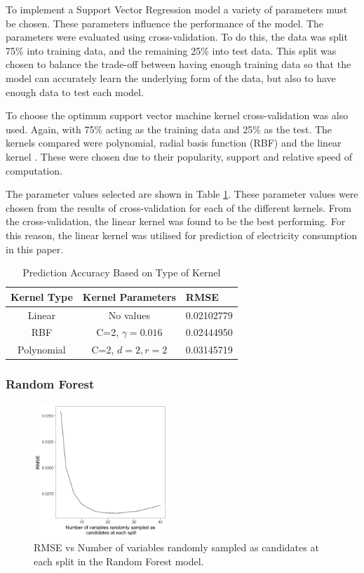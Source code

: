 To implement a Support Vector Regression model a variety of parameters must be chosen. These parameters influence the performance of the model. The parameters were evaluated using cross-validation. To do this, the data was split 75\% into training data, and the remaining 25\% into test data. This split was chosen to balance the trade-off between having enough training data so that the model can accurately learn the underlying form of the data, but also to have enough data to test each model.

To choose the optimum support vector machine kernel cross-validation was also used. Again, with 75\% acting as the training data and 25\% as the test. The kernels compared were polynomial, radial basis function (RBF) and the linear kernel \cite{Chang2010, theodoridis2009pattern}. These were chosen due to their popularity, support and relative speed of computation.

The parameter values selected are shown in Table \ref{tab:kernel}. These parameter values were chosen from the results of cross-validation for each of the different kernels.  From the cross-validation, the linear kernel was found to be the best performing. For this reason, the linear kernel was utilised for prediction of electricity consumption in this paper.

\begin{table}
	\caption{Prediction Accuracy Based on Type of Kernel}
	\label{tab:kernel}
	\begin{tabular}{ccl}
		\toprule
		Kernel Type& Kernel Parameters & RMSE\\
		\midrule
		Linear & No values & 0.02102779\\
		RBF & C=2, $\gamma=0.016$ & 0.02444950\\
		Polynomial & C=2, $d=2, r=2$ & 0.03145719 \\
		\bottomrule
	\end{tabular}
\end{table}


\subsubsection{Random Forest}

\begin{figure}[b]
	\includegraphics[width=0.45\textwidth]{figures/rforest_parameter_tuning}
	\caption{RMSE vs Number of variables randomly sampled as candidates at each split in the Random Forest model.}
	\label{fig:rf_param_tune}
\end{figure}

